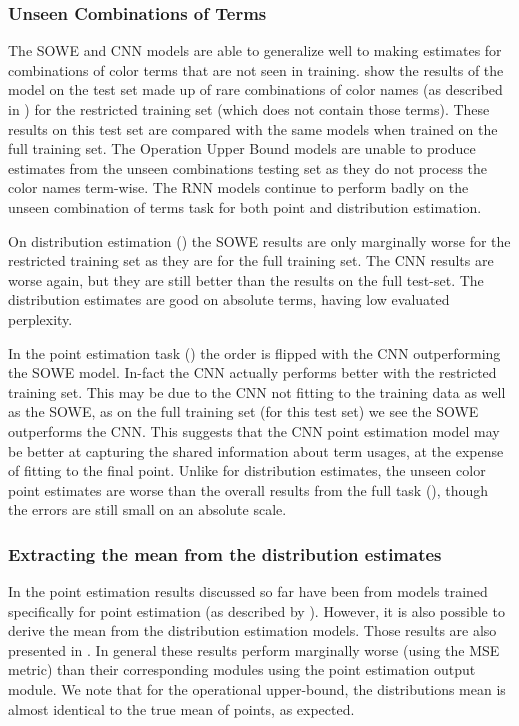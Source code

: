 \documentclass[11pt,a4paper]{article}
\begin{document}
\subsubsection{Unseen Combinations of Terms}
The SOWE and CNN models are able to generalize well to making estimates for combinations of color terms that are not seen in training.
 show the results of the model on the test set made up of rare combinations of color names (as described in ) for the restricted training set (which does not contain those terms).
These results on this test set are compared with the same models when trained on the full training set.
The Operation Upper Bound models are unable to produce estimates from the unseen combinations testing set as they do not process the color names term-wise.
The RNN models continue to perform badly on the unseen combination of terms task for both point and distribution estimation.

On distribution estimation () the SOWE results are only marginally worse for the restricted training set as they are for the full training set.
The CNN results are worse again, but they are still better than the results on the full test-set.
The distribution estimates are good on absolute terms, having low evaluated perplexity.

In the point estimation task () the order is flipped with the CNN outperforming the SOWE model.
In-fact the CNN actually performs better with the restricted training set.
This may be due to the CNN not fitting to the training data as well as the SOWE,
as on the full training set (for this test set) we see the SOWE outperforms the CNN.
This suggests that the CNN point estimation model may be better at capturing the shared information about term usages, at the expense of fitting to the final point.
Unlike for distribution estimates, the unseen color point estimates are worse than the overall results from the full task (), though the errors are still small on an absolute scale.



\subsubsection{Extracting the mean from the distribution estimates}

In the point estimation results discussed so far have been from models trained specifically for point estimation (as described by ).
However, it is also possible to derive the mean from the distribution estimation models.
Those results are also presented in .
In general these results perform marginally worse (using the MSE metric) than their corresponding modules using the point estimation output module.
We note that for the operational upper-bound, the distributions mean is almost identical to the true mean of points, as expected.
\end{document}
